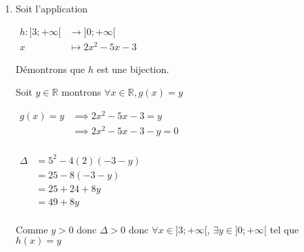 \documentclass[12pt,a4paper]{article}
\begin{document}
\begin{enumerate}
\begin{enumerate}
            \(
            \begin{aligned}
                \Delta &= 5^{2}-4(2)(-3-y)\\
                       &= 25-8(-3-y)\\
                       &= 25+24+8y\\
                       &= 49+8y\\
            \end{aligned} 
            \)

            Si $y\in \left]-\infty;\frac{-49}{8}\right[$ alors il n'existe pas de $x\in\mathbb{R}$ tel que $g(x)=y$

          \begin{resultbox}
            \[
                \mathbf{\text{Donc \( g \) n'est pas surjective non plus.}}
            \]
        \end{resultbox}

        \end{enumerate}

   \item Soit l’application 

$    
\begin{aligned}
        h : ]3 ; +\infty[ &\to ]0 ; +\infty[ \\
        x &\mapsto 2x^2 - 5x - 3
\end{aligned}
$

   Démontrons que \( h \) est une bijection.

   Soit \(y \in \mathbb{R}\) montrons \(\forall x \in \mathbb{R},g(x)=y \)

          \(
          \begin{aligned}
              g(x)=y & \implies 2x^{2}-5x-3=y \\
                     & \implies 2x^{2}-5x-3-y=0\\
          \end{aligned}
          \)

            \(
            \begin{aligned}
                \Delta &= 5^{2}-4(2)(-3-y)\\
                       &= 25-8(-3-y)\\
                       &= 25+24+8y\\
                       &= 49+8y\\
            \end{aligned} 
            \)

            Comme $y>0$ donc $ \Delta > 0 $ donc $\forall x \in ]3;+\infty[$, $\exists y\in ]0;+\infty[$ tel que $ h(x)=y $ 


\end{enumerate}
\end{document}
